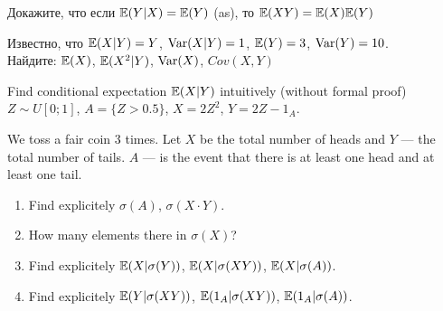 \begin{problem}
Докажите, что если $\mathbb{E}(Y|X)=\mathbb{E}(Y)$ (as), то $\mathbb{E}(XY)=\mathbb{E}(X)\mathbb{E}(Y)$

\begin{sol}

\end{sol}
\end{problem}

\begin{problem}
Известно, что $\mathbb{E}(X|Y)=Y$, $\operatorname{Var}(X|Y)=1$, $\mathbb{E}(Y)=3$, $\operatorname{Var}(Y)=10$. \\
Найдите: $\mathbb{E}(X)$, $\mathbb{E}(X^{2}|Y)$, $\operatorname{Var}(X)$, $Cov(X,Y)$

\begin{sol}

\end{sol}
\end{problem}

\begin{problem}
Find conditional expectation $\mathbb{E}(X|Y)$ intuitively (without formal proof)  \\
$Z\sim U[0;1]$, $A=\{Z>0.5\}$, $X=2Z^{2}$, $Y=2Z-1_{A}$.

\begin{sol}

\end{sol}
\end{problem}

\begin{problem}
We toss a fair coin 3 times. Let $X$ be the total number of heads and $Y$ — the total number of tails. $A$ — is the event that there is at least one head and at least one tail.
\begin{enumerate}
\item Find explicitely $\sigma(A)$, $\sigma(X\cdot Y)$.
\item How many elements there in $\sigma(X)$?
\item Find explicitely $\mathbb{E}(X|\sigma(Y))$, $\mathbb{E}(X|\sigma(XY))$, $\mathbb{E}(X|\sigma(A))$.
\item Find explicitely $\mathbb{E}(Y|\sigma(XY))$, $\mathbb{E}(1_{A}|\sigma(XY))$, $\mathbb{E}(1_{A}|\sigma(A))$.
\end{enumerate}


\begin{sol}

\end{sol}
\end{problem}

